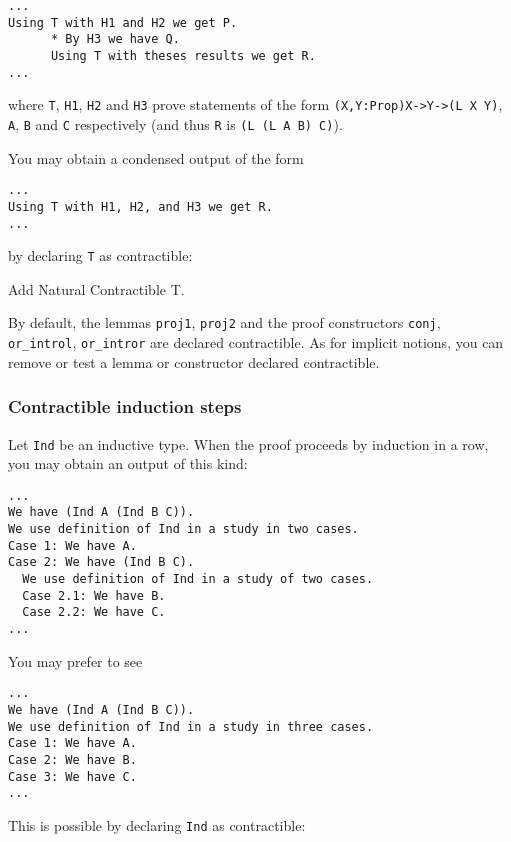 \begin{verbatim}
...
Using T with H1 and H2 we get P.
      * By H3 we have Q.
      Using T with theses results we get R.
...
\end{verbatim}

where \verb=T=, \verb=H1=, \verb=H2= and \verb=H3= prove statements
of the form \verb=(X,Y:Prop)X->Y->(L X Y)=, \verb=A=, \verb=B= and \verb=C=
respectively (and thus \verb=R= is \verb=(L (L A B) C)=).

You may obtain a condensed output of the form

\begin{verbatim}
...
Using T with H1, H2, and H3 we get R.
...
\end{verbatim}

by declaring \verb=T= as contractible:

\begin{coq_example*}
Add Natural Contractible T.
\end{coq_example*}

By default, the lemmas \verb=proj1=, \verb=proj2= and the proof
constructors \verb=conj=, \verb=or_introl=, \verb=or_intror= are
declared contractible. As for implicit notions, you can remove or
test a lemma or constructor declared contractible.

\subsubsection*{Contractible induction steps}

Let \verb=Ind= be an inductive type. When the proof proceeds by
induction in a row, you may obtain an output of this kind:

\begin{verbatim}
...
We have (Ind A (Ind B C)).
We use definition of Ind in a study in two cases.
Case 1: We have A.
Case 2: We have (Ind B C).
  We use definition of Ind in a study of two cases.
  Case 2.1: We have B.
  Case 2.2: We have C.
...
\end{verbatim}

You may prefer to see

\begin{verbatim}
...
We have (Ind A (Ind B C)).
We use definition of Ind in a study in three cases.
Case 1: We have A.
Case 2: We have B.
Case 3: We have C.
...
\end{verbatim}

This is possible by declaring \verb=Ind= as contractible:


